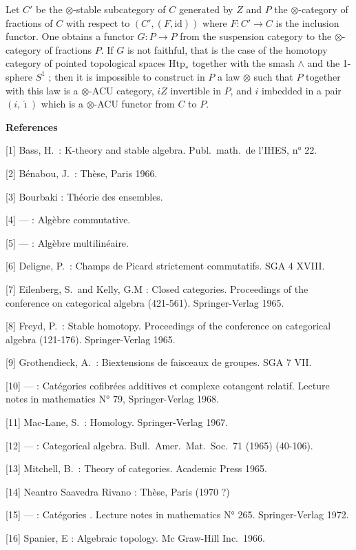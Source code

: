 \documentclass[11pt,a4paper]{article}
\begin{document}
Let $C'$ be the $\otimes$-stable subcategory of $C$ generated by $Z$ and
$P$ the $\otimes$-category of fractions of $C$ with respect to $(C', (F,
\mathrm{id}))$ where $F : C' \to C$ is the inclusion functor. One obtains
a functor $G : P \to P$ from the suspension category to the
$\otimes$-category of fractions $P$.  If $G$ is not faithful, that is the
case of the homotopy category of pointed topological spaces
$\mathrm{Htp}_{*}$ together with the smash $\wedge$ and the 1-sphere
$S^{1}$ ; then it is impossible to construct in $P$ a law $\otimes$ such
that $P$ together with this law is a $\otimes$-ACU category, $iZ$
invertible in $P$, and $i$ imbedded in a pair $(i, \check{\imath})$ which
is a $\otimes$-ACU functor from $C$ to $P$.

\textbf{References}

[1] Bass, H.\ : K-theory and stable algebra. Publ.\ math.\ de l'IHES,
n° 22.

[2] Bénabou, J.\ : Thèse, Paris 1966.

[3] Bourbaki : Théorie des ensembles.

[4] --- : Algèbre commutative.

[5] --- : Algèbre multilinéaire.

[6] Deligne, P.\ : Champs de Picard strictement commutatifs. SGA 4 XVIII.

[7] Eilenberg, S.\ and Kelly, G.M : Closed categories. Proceedings of the
conference on categorical algebra (421-561). Springer-Verlag 1965.

[8] Freyd, P.\ : Stable homotopy. Proceedings of the conference on
categorical algebra (121-176). Springer-Verlag 1965.

[9] Grothendieck, A.\ : Biextensions de faisceaux de groupes. SGA 7 VII.

[10] --- : Catégories cofibrées additives et complexe cotangent relatif.
Lecture notes in mathematics N° 79, Springer-Verlag 1968.

[11] Mac-Lane, S.\ : Homology. Springer-Verlag 1967.

[12] --- : Categorical algebra. Bull.\ Amer.\ Mat.\ Soc.\ 71 (1965)
(40-106).

[13] Mitchell, B.\ : Theory of categories. Academic Press 1965.

[14] Neantro Saavedra Rivano : Thèse, Paris (1970 ?)

[15] --- : Catégories . Lecture notes in
mathematics N° 265. Springer-Verlag 1972. 

[16] Spanier, E : Algebraic topology. Mc Graw-Hill Inc.\ 1966.
\end{document}
